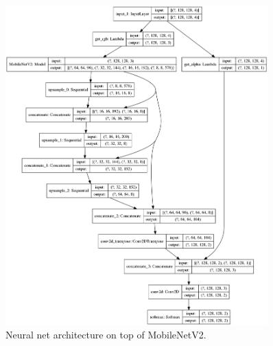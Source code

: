 \documentclass[12pt,a4paper]{article}
\begin{document}
    \begin{figure}[p]
        \centering
        \includegraphics[width=0.9\textwidth]{images/full_model}
        \caption{Neural net architecture on top of MobileNetV2.}
        \label{f:model}
    \end{figure}
\end{document}

